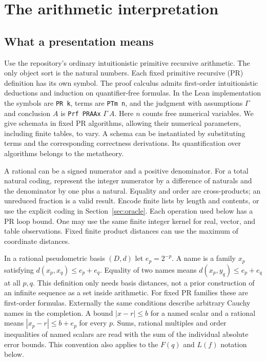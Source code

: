 \section{The arithmetic interpretation}
\label{sec:basis}

\subsection{What a presentation means}

Use the repository's ordinary intuitionistic primitive recursive arithmetic.
The only object sort is the natural numbers. Each fixed primitive recursive
(PR) definition has its own symbol. The proof calculus admits first-order
intuitionistic deductions and induction on quantifier-free formulas. In the Lean
implementation the symbols are \texttt{PR k}, terms are \texttt{PTm n}, and the
judgment with assumptions $\Gamma$ and conclusion $A$ is \texttt{Prf PRAAx}
$\Gamma\ A$. Here $n$ counts free numerical variables. We give schemata in fixed
PR algorithms, allowing their numerical parameters, including finite tables, to
vary. A schema can be instantiated by substituting terms and the corresponding
correctness derivations. Its quantification over algorithms belongs to the
metatheory.

A rational can be a signed numerator and a positive denominator. For a total
natural coding, represent the integer numerator by a difference of naturals and
the denominator by one plus a natural. Equality and order are cross-products;
an unreduced fraction is a valid result. Encode finite lists by length and
contents, or use the explicit coding in Section~\ref{sec:oracle}. Each
operation used below has a PR loop bound. One may use the same finite integer
kernel for real, vector, and table observations. Fixed finite product distances
can use the maximum of coordinate distances.

In a rational pseudometric basis $(D,d)$ let $e_p=2^{-p}$. A name is a family
$x_p$ satisfying $d(x_p,x_q)\le e_p+e_q$. Equality of two names means
$d(x_p,y_q)\le e_p+e_q$ at all $p,q$. This definition only needs basis distances,
not a prior construction of an infinite sequence as a set inside arithmetic.
For fixed PR families these are first-order formulas. Externally the same
conditions describe arbitrary Cauchy names in the completion. A bound
$|x-r|\le b$ for a named scalar and a rational means
$|x_p-r|\le b+e_p$ for every $p$. Sums, rational multiples and order inequalities
of named scalars are read with the sum of the individual absolute error bounds.
This convention also applies to the $F(q)$ and $L(f)$ notation below.

